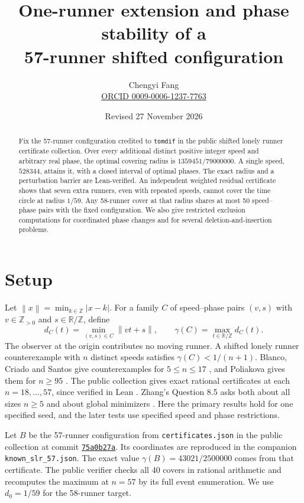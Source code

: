 \documentclass[11pt]{article}
\title{One-runner extension and phase stability of a\\
       57-runner shifted configuration}
\author{Chengyi Fang\\[-2pt]\small
\href{https://orcid.org/0009-0006-1237-7763}{ORCID 0009-0006-1237-7763}}
\date{Revised 27 November 2026}
\newcommand{\T}{\mathbb{R}/\mathbb{Z}}
\newcommand{\Z}{\mathbb{Z}}
\newcommand{\norm}[1]{\left\lVert #1\right\rVert}
\begin{document}
\maketitle
\begin{abstract}
Fix the 57-runner configuration credited to \texttt{tomdif} in the
public shifted lonely runner certificate collection. Over every
additional distinct positive integer speed and arbitrary real phase,
the optimal covering radius is \(1359451/79000000\). A single speed,
\(528344\), attains it, with a closed interval of optimal phases.
The exact radius and a perturbation barrier are Lean-verified.
An independent weighted residual certificate shows that seven extra
runners, even with repeated speeds, cannot cover the time circle at
radius \(1/59\). Any 58-runner cover at that radius shares at most
50 speed--phase pairs with the fixed configuration. We also give
restricted exclusion computations for coordinated phase changes and
for several deletion-and-insertion problems.
\end{abstract}

\section{Setup}

Let \(\norm{x}=\min_{k\in\Z}|x-k|\). For a family \(C\) of
speed--phase pairs \((v,s)\) with \(v\in\Z_{>0}\) and \(s\in\T\), define
\[
 d_C(t)=\min_{(v,s)\in C}\norm{vt+s},\qquad
 \gamma(C)=\max_{t\in\T}d_C(t).
\]
The observer at the origin contributes no moving runner. A shifted
lonely runner counterexample with \(n\) distinct speeds satisfies
\(\gamma(C)<1/(n+1)\). Blanco, Criado and Santos give counterexamples
for \(5\le n\le17\) \cite[Theorem 1.8]{BCS}, and Poliakova
gives them for \(n\ge95\) \cite[Theorem 2]{Poliakova}. The public
collection \cite{upstream} gives exact rational certificates at each
\(n=18,\ldots,57\), since verified in Lean \cite{upstreamlean}.
Zhang's Question 8.5 asks both about all sizes \(n\ge5\) and about
global minimizers \cite{Zhang}. Here the primary results hold for one
specified seed, and the later tests use specified speed and phase
restrictions.

Let \(B\) be the 57-runner configuration from
\texttt{certificates.json} in the public collection at commit
\href{https://github.com/1337isnot1337/solved-conjectures/blob/75a0b27a1b3e76715a45704865454b14f8f1c63d/results/shifted-lonely-runner-counterexamples/certificates.json}{\texttt{75a0b27a}}.
Its coordinates are reproduced in the companion
\texttt{known\_slr\_57.json}. The exact value
\(\gamma(B)=43021/2500000\) comes from that certificate.
The public verifier checks all 40 covers in rational arithmetic and
recomputes the maximum at \(n=57\) by its full event enumeration.
We use \(d_0=1/59\) for the 58-runner target.
\end{document}
